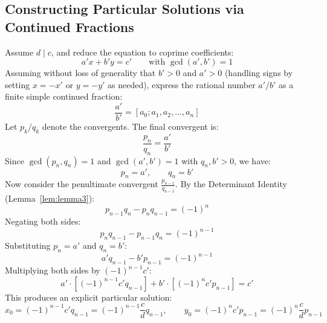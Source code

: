 \documentclass[a4paper]{article}
\begin{document}
\subsection{Constructing Particular Solutions via Continued Fractions}
Assume $d \mid c$, and reduce the equation to coprime coefficients:
\[
  a' x + b' y = c' \qquad \text{with } \gcd(a', b') = 1
\]
Assuming without loss of generality that $b' > 0$ and $a' > 0$ (handling signs by setting $x = -x'$ or $y = -y'$ as needed), express the rational number $a'/b'$ as a finite simple continued fraction:
\[
  \frac{a'}{b'} = [a_0; a_1, a_2, \dots, a_n]
\]
Let $p_k/q_k$ denote the convergents.
The final convergent is:
\[
  \frac{p_n}{q_n} = \frac{a'}{b'}
\]
Since $\gcd(p_n, q_n) = 1$ and $\gcd(a', b') = 1$ with $q_n, b' > 0$, we have:
\[
  p_n = a', \qquad q_n = b'
\]
Now consider the penultimate convergent $\frac{p_{n-1}}{q_{n-1}}$.
By the Determinant Identity (Lemma~\ref{lem:lemma3}):
\[
  p_{n-1} q_n - p_n q_{n-1} = (-1)^n
\]
Negating both sides:
\[
  p_n q_{n-1} - p_{n-1} q_n = (-1)^{n-1}
\]
Substituting $p_n = a'$ and $q_n = b'$:
\[
  a' q_{n-1} - b' p_{n-1} = (-1)^{n-1}
\]
Multiplying both sides by $(-1)^{n-1} c'$:
\[
  a' \cdot \left[ (-1)^{n-1} c' q_{n-1} \right] + b' \cdot \left[ (-1)^n c' p_{n-1} \right] = c'
\]
This produces an explicit particular solution:
\begin{equation}\label{cf:eq:particular-solution}
  x_0 = (-1)^{n-1} c' q_{n-1} = (-1)^{n-1} \frac{c}{d} q_{n-1}, \qquad y_0 = (-1)^n c' p_{n-1} = (-1)^n \frac{c}{d} p_{n-1}
\end{equation}
\end{document}

